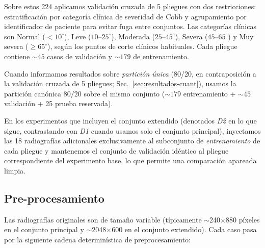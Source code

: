 \documentclass[conference]{IEEEtran}
\begin{document}
Sobre estos 224 aplicamos validación cruzada de 5 pliegues con dos restricciones: estratificación por categoría clínica de severidad de Cobb y agrupamiento por identificador de paciente para evitar fuga entre conjuntos. Las categorías clínicas son Normal ($< 10^{\circ}$), Leve ($10$--$25^{\circ}$), Moderada ($25$--$45^{\circ}$), Severa ($45$--$65^{\circ}$) y Muy severa ($\geq 65^{\circ}$), según los puntos de corte clínicos habituales. Cada pliegue contiene $\sim 45$ casos de validación y $\sim 179$ de entrenamiento.

Cuando informamos resultados sobre \emph{partición única} (80/20, en contraposición a la validación cruzada de 5 pliegues; Sec.~\ref{sec:resultados-cuant}), usamos la partición canónica $80/20$ sobre el mismo conjunto ($\sim 179$ entrenamiento + $\sim 45$ validación + 25 prueba reservada).

En los experimentos que incluyen el conjunto extendido (denotados \emph{D2} en lo que sigue, contrastando con \emph{D1} cuando usamos solo el conjunto principal), inyectamos las 18 radiografías adicionales exclusivamente al subconjunto de \emph{entrenamiento} de cada pliegue y mantenemos el conjunto de validación idéntico al pliegue correspondiente del experimento base, lo que permite una comparación apareada limpia.

\subsection{Pre-procesamiento}
\label{sec:preprocesamiento}

Las radiografías originales son de tamaño variable (típicamente $\sim$240$\times$880 píxeles en el conjunto principal y $\sim$2048$\times$600 en el conjunto extendido). Cada caso pasa por la siguiente cadena determinística de preprocesamiento:
\end{document}
